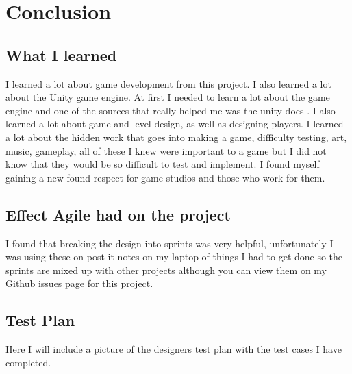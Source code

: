 \documentclass{report}
\begin{document}
\chapter{Conclusion}
\section{What I learned}
I learned a lot about game development from this project.  I also learned a lot about the Unity game engine.  At first I needed to learn a lot about the game engine and one of the sources that really helped me was the unity docs \cite{UnityDocs}.  I also learned a lot about game and level design, as well as designing players. I learned a lot about the hidden work that goes into making a game, difficulty testing, art, music, gameplay, all of these I knew were important to a game but I did not know that they would be so difficult to test and implement. I found myself gaining a new found respect for game studios and those who work for them.
\section{Effect Agile had on the project}
I found that breaking the design into sprints was very helpful, unfortunately I was using these on post it notes on my laptop of things I had to get done so the sprints are mixed up with other projects although you can view them on my Github issues page for this project.
\section{Test Plan}
Here I will include a picture of the designers test plan with the test cases I have completed.


\end{document}
